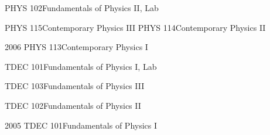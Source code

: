 \documentclass[]{scrartcl}
\begin{document}
\begin{cleanCV}
\Teaching
{}
{PHYS 102}{Fundamentals of Physics II, Lab}

\Teaching
{}
{PHYS 115}{Contemporary Physics III\TeachingNote}
\Teaching
{}
{PHYS 114}{Contemporary Physics II\TeachingNote}

\Teaching
{2006}
{PHYS 113}{Contemporary Physics I\TeachingNote}

\Teaching
{}
{TDEC 101}{Fundamentals of Physics I, Lab}

\Teaching
{}
{TDEC 103}{Fundamentals of Physics III\TeachingNote}

\Teaching
{}
{TDEC 102}{Fundamentals of Physics II\TeachingNote}

\Teaching
{2005}
{TDEC 101}{Fundamentals of Physics I\TeachingNote}




\end{cleanCV}
\end{document}
